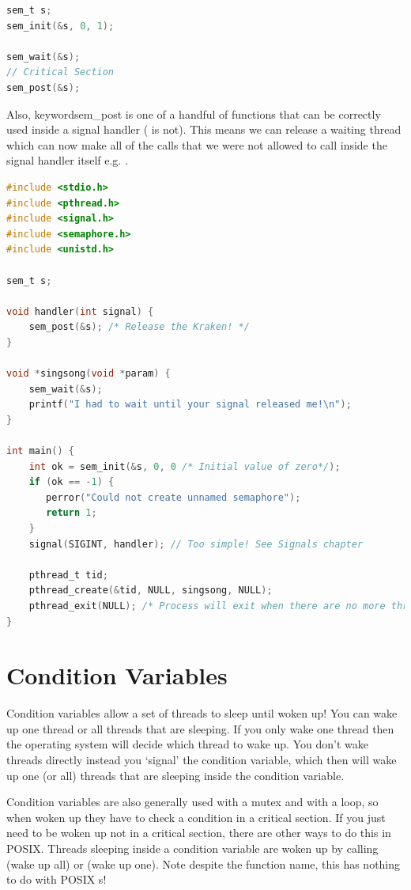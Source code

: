 \begin{lstlisting}[language=C]
sem_t s;
sem_init(&s, 0, 1);

sem_wait(&s);
// Critical Section
sem_post(&s);
\end{lstlisting}

Also, keyword{sem\_post} is one of a handful of functions that can be correctly used inside a signal handler ( is not). This means we can release a waiting thread which can now make all of the calls that we were not allowed to call inside the signal handler itself e.g. .

\begin{lstlisting}[language=C]
#include <stdio.h>
#include <pthread.h>
#include <signal.h>
#include <semaphore.h>
#include <unistd.h>

sem_t s;

void handler(int signal) {
    sem_post(&s); /* Release the Kraken! */
}

void *singsong(void *param) {
    sem_wait(&s);
    printf("I had to wait until your signal released me!\n");
}

int main() {
    int ok = sem_init(&s, 0, 0 /* Initial value of zero*/); 
    if (ok == -1) {
       perror("Could not create unnamed semaphore");
       return 1;
    }
    signal(SIGINT, handler); // Too simple! See Signals chapter

    pthread_t tid;
    pthread_create(&tid, NULL, singsong, NULL);
    pthread_exit(NULL); /* Process will exit when there are no more threads */
}
\end{lstlisting}

\section{Condition Variables}

Condition variables allow a set of threads to sleep until woken up! You can wake up one thread or all threads that are sleeping. If you only wake one thread then the operating system will decide which thread to wake up. You don't wake threads directly instead you `signal' the condition variable, which then will wake up one (or all) threads that are sleeping inside the condition variable.

Condition variables are also generally used with a mutex and with a loop, so when woken up they have to check a condition in a critical section. If you just need to be woken up not in a critical section, there are other ways to do this in POSIX. Threads sleeping inside a condition variable are woken up by calling  (wake up all) or  (wake up one). Note despite the function name, this has nothing to do with POSIX s!

